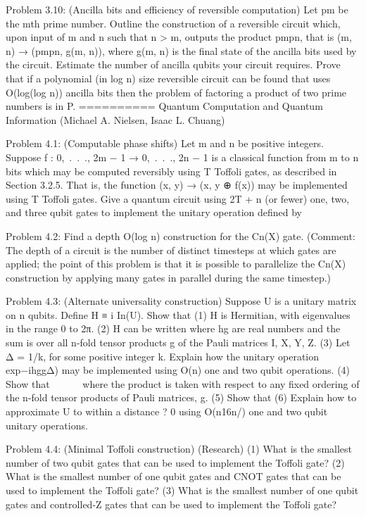 \documentclass{article}
\newcommand{\0}{{$|0\rangle$}}
\newcommand{\1}{{$|1\rangle$}}
\newcommand{\2}{\frac{1}{\sqrt{2}}}
\begin{document}
Problem 3.10: (Ancilla bits and efficiency of reversible computation) Let pm be the mth prime number. Outline the construction of a reversible circuit which, upon input of m and n such that n > m, outputs the product pmpn, that is (m, n) → (pmpn, g(m, n)), where g(m, n) is the final state of the ancilla bits used by the circuit. Estimate the number of ancilla qubits your circuit requires. Prove that if a polynomial (in log n) size reversible circuit can be found that uses O(log(log n)) ancilla bits then the problem of factoring a product of two prime numbers is in P.
==========
Quantum Computation and Quantum Information (Michael A. Nielsen, Isaac L. Chuang)

Problem 4.1: (Computable phase shifts) Let m and n be positive integers. Suppose f : {0, . . ., 2m − 1} → {0, . . ., 2n − 1} is a classical function from m to n bits which may be computed reversibly using T Toffoli gates, as described in Section 3.2.5. That is, the function (x, y) → (x, y ⊕ f(x)) may be implemented using T Toffoli gates. Give a quantum circuit using 2T + n (or fewer) one, two, and three qubit gates to implement the unitary operation defined by

Problem 4.2: Find a depth O(log n) construction for the Cn(X) gate. (Comment: The depth of a circuit is the number of distinct timesteps at which gates are applied; the point of this problem is that it is possible to parallelize the Cn(X) construction by applying many gates in parallel during the same timestep.)

Problem 4.3: (Alternate universality construction) Suppose U is a unitary matrix on n qubits. Define H ≡ i In(U). Show that (1) H is Hermitian, with eigenvalues in the range 0 to 2π. (2) H can be written where hg are real numbers and the sum is over all n-fold tensor products g of the Pauli matrices {I, X, Y, Z}. (3) Let Δ = 1/k, for some positive integer k. Explain how the unitary operation exp−ihggΔ) may be implemented using O(n) one and two qubit operations. (4) Show that       where the product is taken with respect to any fixed ordering of the n-fold tensor products of Pauli matrices, g. (5) Show that (6) Explain how to approximate U to within a distance ? 0 using O(n16n/) one and two qubit unitary operations.

Problem 4.4: (Minimal Toffoli construction) (Research) (1) What is the smallest number of two qubit gates that can be used to implement the Toffoli gate? (2) What is the smallest number of one qubit gates and CNOT gates that can be used to implement the Toffoli gate? (3) What is the smallest number of one qubit gates and controlled-Z gates that can be used to implement the Toffoli gate?
\end{document}
